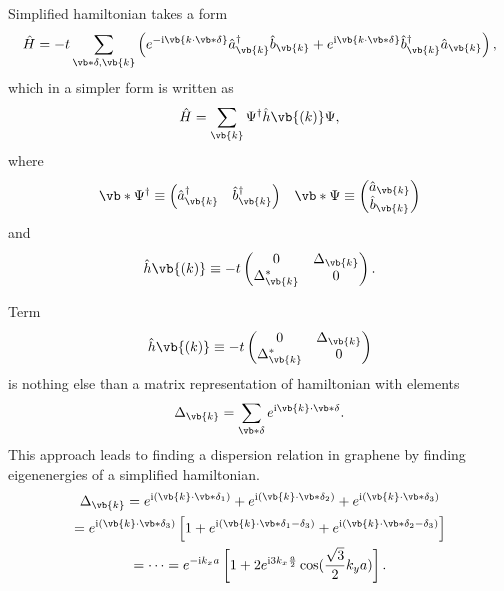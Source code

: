\documentclass{beamer}
\newcommand{\imag}{\text{i}}
\begin{document}
\begin{frame}
	Simplified hamiltonian takes a form
	\begin{equation}
		\hat{H} = -t\sum_{\vb*{\delta},\vb{k}}\left(e^{-\imag\vb{k\cdot\vb*{\delta}}}\hat{a}^\dagger_{\vb{k}}\hat{b}_{\vb{k}}  + e^{\imag\vb{k\cdot\vb*{\delta}}}\hat{b}^\dagger_{\vb{k}}\hat{a}_{\vb{k}} \right),
	\end{equation}
	which in a simpler form is written as
	\begin{equation}
		\hat{H} = \sum_{\vb{k}} \Psi^\dagger \hat{h}\vb{(k)} \Psi,
	\end{equation}
	where
	\begin{equation}
		\vb*{\Psi}^\dagger \equiv
		\begin{pmatrix}
			\hat{a}^\dagger_{\vb{k}} & \hat{b}^\dagger_{\vb{k}}
		\end{pmatrix}
		\; \; \;
		\vb*{\Psi} \equiv
		\begin{pmatrix}
			\hat{a}_{\vb{k}} \\ \hat{b}_{\vb{k}}
		\end{pmatrix}
	\end{equation}
	and
	\begin{equation}
		\hat{h}\vb{(k)} \equiv -t
		\begin{pmatrix}
			0                 & \Delta_{\vb{k}} \\
			\Delta_{\vb{k}}^* & 0
		\end{pmatrix}.
	\end{equation}
\end{frame}

\begin{frame}
	Term
	\begin{equation}
		\hat{h}\vb{(k)} \equiv -t
		\begin{pmatrix}
			0                 & \Delta_{\vb{k}} \\
			\Delta_{\vb{k}}^* & 0
		\end{pmatrix}
	\end{equation}
	is nothing else than a matrix representation of hamiltonian with elements
	\begin{equation}
		\Delta_{\vb{k}} = \sum_{\vb*{\delta}} e^{\imag \vb{k}\cdot \vb*{\delta}}.
	\end{equation}
	This approach leads to finding a dispersion relation in graphene by finding eigenenergies of a simplified hamiltonian.
	\begin{gather}
		\Delta_{\vb{k}} = e^{\imag(\vb{k}\cdot\vb*{\delta_1})} + e^{\imag(\vb{k}\cdot\vb*{\delta_2})} + e^{\imag(\vb{k}\cdot\vb*{\delta_3})}
		\\
		=
		e^{\imag(\vb{k}\cdot\vb*{\delta_3})}\left[1
			+ e^{\imag(\vb{k}\cdot\vb*{\delta_1 - \delta_3})} + e^{\imag(\vb{k}\cdot\vb*{\delta_2 - \delta_3})}
			\right]
		\\
		=
		\dots
		=
		e^{-\imag k_x a}\left[1 + 2e^{\imag 3k_x\frac{a}{2}}\cos(\frac{\sqrt{3}}{2}k_y a) \right].
	\end{gather}
\end{frame}
\end{document}
